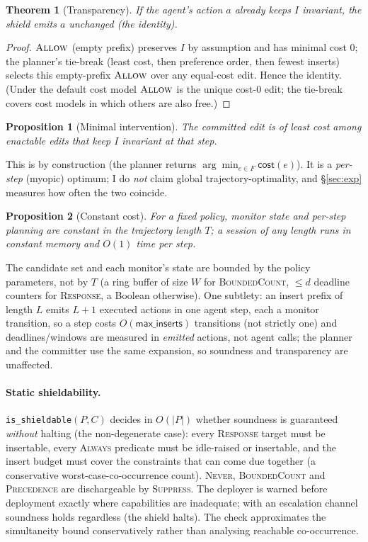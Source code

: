\documentclass[11pt]{article}
\newtheorem{proposition}{Proposition}
\newtheorem{theorem}{Theorem}
\begin{document}
\begin{theorem}[Transparency]
\label{thm:transp}
If the agent's action $a$ already keeps $I$ invariant, the shield emits $a$
unchanged (the identity).
\end{theorem}
\begin{proof}
$\textsc{Allow}$ (empty prefix) preserves $I$ by assumption and has minimal cost
$0$; the planner's tie-break (least cost, then preference order, then fewest
inserts) selects this empty-prefix $\textsc{Allow}$ over any equal-cost edit.
Hence the identity. (Under the default cost model $\textsc{Allow}$ is the unique
cost-$0$ edit; the tie-break covers cost models in which others are also free.)
\end{proof}

\begin{proposition}[Minimal intervention]
\label{prop:min}
The committed edit is of least cost among enactable edits that keep $I$ invariant
at that step.
\end{proposition}
This is by construction (the planner returns $\arg\min_{e\in F}\textsf{cost}(e)$).
It is a \emph{per-step} (myopic) optimum; I do \emph{not} claim global
trajectory-optimality, and \S\ref{sec:exp} measures how often the two coincide.

\begin{proposition}[Constant cost]
\label{prop:cost}
For a fixed policy, monitor state and per-step planning are constant in the
trajectory length $T$; a session of any length runs in constant memory and
$O(1)$ time per step.
\end{proposition}
The candidate set and each monitor's state are bounded by the policy parameters,
not by $T$ (a ring buffer of size $W$ for \textsc{BoundedCount}, $\le d$ deadline
counters for \textsc{Response}, a Boolean otherwise). One subtlety: an insert
prefix of length $L$ emits $L{+}1$ executed actions in one agent step, each a
monitor transition, so a step costs $O(\textsf{max\_inserts})$ transitions (not
strictly one) and deadlines/windows are measured in \emph{emitted} actions, not
agent calls; the planner and the committer use the same expansion, so soundness
and transparency are unaffected.

\paragraph{Static shieldability.} \texttt{is\_shieldable}$(P,C)$ decides in
$O(|P|)$ whether soundness is guaranteed \emph{without} halting (the
non-degenerate case): every \textsc{Response} target must be insertable, every
\textsc{Always} predicate must be idle-raised or insertable, and the insert budget
must cover the constraints that can come due together (a conservative
worst-case-co-occurrence count). \textsc{Never}, \textsc{BoundedCount} and
\textsc{Precedence} are dischargeable by \textsc{Suppress}. The deployer is warned
before deployment exactly where capabilities are inadequate; with an escalation
channel soundness holds regardless (the shield halts). The check approximates the
simultaneity bound conservatively rather than analysing reachable co-occurrence.
\end{document}
